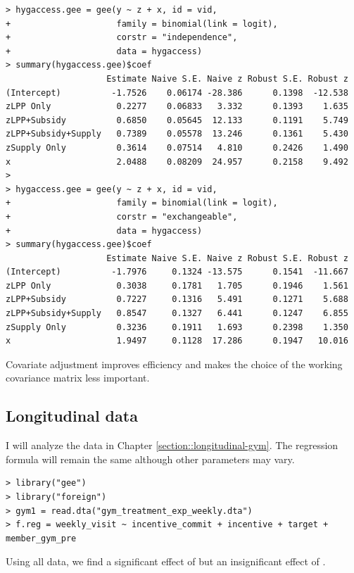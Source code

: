 \begin{lstlisting}
> hygaccess.gee = gee(y ~ z + x, id = vid,
+                     family = binomial(link = logit),
+                     corstr = "independence", 
+                     data = hygaccess)
> summary(hygaccess.gee)$coef
                    Estimate Naive S.E. Naive z Robust S.E. Robust z
(Intercept)          -1.7526    0.06174 -28.386      0.1398  -12.538
zLPP Only             0.2277    0.06833   3.332      0.1393    1.635
zLPP+Subsidy          0.6850    0.05645  12.133      0.1191    5.749
zLPP+Subsidy+Supply   0.7389    0.05578  13.246      0.1361    5.430
zSupply Only          0.3614    0.07514   4.810      0.2426    1.490
x                     2.0488    0.08209  24.957      0.2158    9.492
> 
> hygaccess.gee = gee(y ~ z + x, id = vid,
+                     family = binomial(link = logit),
+                     corstr = "exchangeable", 
+                     data = hygaccess)
> summary(hygaccess.gee)$coef
                    Estimate Naive S.E. Naive z Robust S.E. Robust z
(Intercept)          -1.7976     0.1324 -13.575      0.1541  -11.667
zLPP Only             0.3038     0.1781   1.705      0.1946    1.561
zLPP+Subsidy          0.7227     0.1316   5.491      0.1271    5.688
zLPP+Subsidy+Supply   0.8547     0.1327   6.441      0.1247    6.855
zSupply Only          0.3236     0.1911   1.693      0.2398    1.350
x                     1.9497     0.1128  17.286      0.1947   10.016
\end{lstlisting}

Covariate adjustment improves efficiency and makes the choice of the working covariance matrix less important. 

 
 
 
\subsection{Longitudinal data}

I will analyze the data in Chapter \ref{section::longitudinal-gym}. 
The regression formula  will remain the same although other parameters may vary. 

\begin{lstlisting}
> library("gee")
> library("foreign")
> gym1 = read.dta("gym_treatment_exp_weekly.dta")
> f.reg = weekly_visit ~ incentive_commit + incentive + target + member_gym_pre
\end{lstlisting}


Using all data, we find a significant effect of  but an insignificant effect of . 

